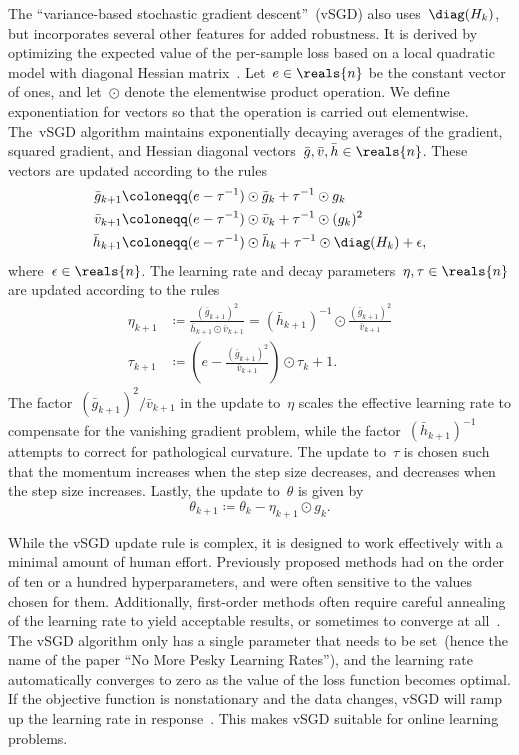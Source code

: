 \documentclass[11pt,a4paper]{article}
\numberwithin{equation}{section}
\begin{document}
The ``variance-based stochastic gradient descent''~(vSGD) also
uses~$\diag(H_k)$, but incorporates several other features for added robustness.
It is derived by optimizing the expected value of the per-sample loss based on a
local quadratic model with diagonal Hessian matrix~\citep{schaul-icml-13}.
Let~$e \in \reals{n}$ be the constant vector of ones, and let~$\odot$ denote the
elementwise product operation. We define exponentiation for vectors so that the
operation is carried out elementwise. The~vSGD algorithm maintains exponentially
decaying averages of the gradient, squared gradient, and Hessian diagonal
vectors~$\bar{g}, \bar{v}, \bar{h} \in \reals{n}$. These vectors are updated
according to the rules
\begin{align*}
	\bar{g}_{k + 1} &\coloneqq (e - \tau^{-1}) \odot \bar{g}_k + \tau^{-1} \odot g_k \\
	\bar{v}_{k + 1} &\coloneqq (e - \tau^{-1}) \odot \bar{v}_k + \tau^{-1} \odot (g_k)^2 \\
	\bar{h}_{k + 1} &\coloneqq (e - \tau^{-1}) \odot \bar{h}_k + \tau^{-1} \odot \diag(H_k)
		+ \epsilon,
\end{align*}
where~$\epsilon \in \reals{n}$. The learning rate and decay parameters~$\eta,
\tau \in \reals{n}$ are updated according to the rules
\begin{align*}
	\eta_{k + 1} &\coloneqq \frac{(\bar{g}_{k + 1})^2}
		{\bar{h}_{k + 1} \odot \bar{v}_{k + 1}}
	= (\bar{h}_{k + 1})^{-1} \odot
		\frac{(\bar{g}_{k + 1})^2}{\bar{v}_{k + 1}} \\
	\tau_{k + 1} &\coloneqq \left( e - \frac{(\bar{g}_{k + 1})^2}{\bar{v}_{k + 1}} \right)
		\odot \tau_k + 1.
\end{align*}
The factor~$(\bar{g}_{k + 1})^2 / \bar{v}_{k + 1}$ in the update to~$\eta$
scales the effective learning rate to compensate for the vanishing gradient
problem, while the factor~$(\bar{h}_{k + 1})^{-1}$ attempts to correct for
pathological curvature. The update to~$\tau$ is chosen such that the momentum
increases when the step size decreases, and decreases when the step size
increases. Lastly, the update to~$\theta$ is given by
\[
	\theta_{k + 1} \coloneqq \theta_k - \eta_{k + 1} \odot g_k.
\]

While the vSGD update rule is complex, it is designed to work effectively with a
minimal amount of human effort. Previously proposed methods had on the order of
ten or a hundred hyperparameters, and were often sensitive to the values chosen
for them. Additionally, first-order methods often require careful annealing of
the learning rate to yield acceptable results, or sometimes to converge at
all~\citep{krizhevsky2012imagenet}. The vSGD algorithm only has a single
parameter that needs to be set~(hence the name of the paper ``No More Pesky
Learning Rates''), and the learning rate automatically converges to zero as the
value of the loss function becomes optimal. If the objective function is
nonstationary and the data changes, vSGD will ramp up the learning rate in
response~\citep{schaul-icml-13}. This makes vSGD suitable for online learning
problems.
\end{document}
